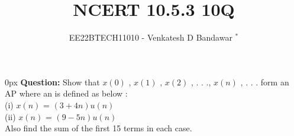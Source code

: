 \documentclass[journal,12pt,twocolumn]{IEEEtran}
\theoremstyle{remark}
\begin{document}

\vspace{3cm}

\title{NCERT 10.5.3 10Q}
\author{EE22BTECH11010 - Venkatesh D Bandawar $^{*}$%
}
\maketitle
\newpage
\bigskip

\renewcommand{\thefigure}{\theenumi}
\renewcommand{\thetable}{\theenumi}

\parindent 0px
\textbf{Question:} Show that $x(0)$ , $x(1)$
, $x(2)$
, . . ., $x(n)$
, . . . form an AP where an is defined as below :\\
(i) $x(n)$ = $(3 + 4n)u(n)$ \\ (ii) $x(n)$ = $(9 - 5n)u(n)$ \\
Also find the sum of the first 15 terms in each case.
\end{document}
